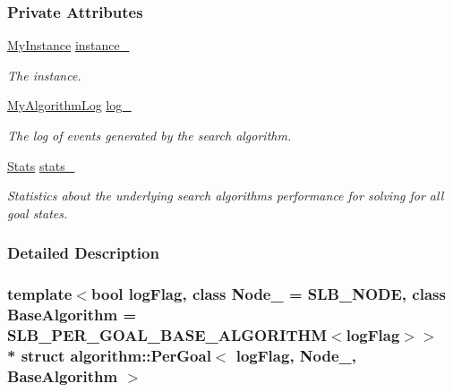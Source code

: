 \subsubsection*{Private Attributes}
\begin{DoxyCompactItemize}
\item 
\hyperlink{structalgorithm_1_1PerGoal_abc8d409fe41f1ee61d4c1a6132c62801}{My\+Instance} \hyperlink{structalgorithm_1_1PerGoal_a5db83713e67c290abb123b9371acb252}{instance\+\_\+}\hypertarget{structalgorithm_1_1PerGoal_a5db83713e67c290abb123b9371acb252}{}\label{structalgorithm_1_1PerGoal_a5db83713e67c290abb123b9371acb252}

\begin{DoxyCompactList}\small\item\em The instance. \end{DoxyCompactList}\item 
\hyperlink{structalgorithm_1_1PerGoal_aef16fed26bdac27da2059957a1e24650}{My\+Algorithm\+Log} \hyperlink{structalgorithm_1_1PerGoal_a48c90c030c9ed1ff0355bcbee067cf54}{log\+\_\+}\hypertarget{structalgorithm_1_1PerGoal_a48c90c030c9ed1ff0355bcbee067cf54}{}\label{structalgorithm_1_1PerGoal_a48c90c030c9ed1ff0355bcbee067cf54}

\begin{DoxyCompactList}\small\item\em The log of events generated by the search algorithm. \end{DoxyCompactList}\item 
\hyperlink{structStats}{Stats} \hyperlink{structalgorithm_1_1PerGoal_ab1df47c6ae78035e9e9e5faef5c21502}{stats\+\_\+}\hypertarget{structalgorithm_1_1PerGoal_ab1df47c6ae78035e9e9e5faef5c21502}{}\label{structalgorithm_1_1PerGoal_ab1df47c6ae78035e9e9e5faef5c21502}

\begin{DoxyCompactList}\small\item\em Statistics about the underlying search algorithm\textquotesingle{}s performance for solving for all goal states. \end{DoxyCompactList}\end{DoxyCompactItemize}


\subsubsection{Detailed Description}
\subsubsection*{template$<$bool log\+Flag, class Node\+\_\+ = S\+L\+B\+\_\+\+N\+O\+DE, class Base\+Algorithm = S\+L\+B\+\_\+\+P\+E\+R\+\_\+\+G\+O\+A\+L\+\_\+\+B\+A\+S\+E\+\_\+\+A\+L\+G\+O\+R\+I\+T\+H\+M$<$log\+Flag$>$$>$\\*
struct algorithm\+::\+Per\+Goal$<$ log\+Flag, Node\+\_\+, Base\+Algorithm $>$}

